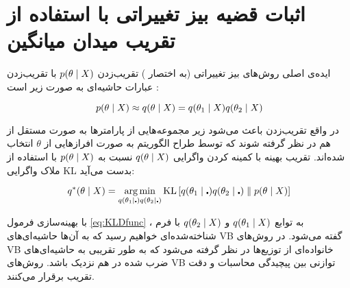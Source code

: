 ﻿%

\section{اثبات قضیه بیز تغییراتی با استفاده از تقریب میدان میانگین}
\label{app:VBProof}

ایده‌ی اصلی روش‌های بیز تغییراتی (به اختصار
)
تقریب‌زدن
$ p ( \theta \mid X ) $
با تقریب‌زدن عبارات حاشیه‌ای به صورت زیر است
\cite{VBMethodsInSignal}:


\begin{equation*}
 p ( \theta \mid X )  \approx
	 q ( \theta \mid X )  =
		 q ( \theta_1 \mid X ) 
		 q ( \theta_2 \mid X ) 
\end{equation*}


در واقع تقریب‌زدن باعث می‌شود زیر مجموعه‌هایی از پارامترها به صورت مستقل
از هم در نظر گرفته شوند که توسط طراح الگوریتم به صورت افرازهایی از
$\theta$
انتخاب شده‌اند. تقریب بهینه با کمینه کردن واگرایی
$ q ( \theta \mid X ) $
نسبت به
$ p ( \theta \mid X ) $
با استفاده از ملاک واگرایی
KL
بدست می‌آید:


\begin{equation}
\label{eq:KLDfunc}
 q^* ( \theta \mid X )  = \underset{
	 q ( \theta_1 \mid \centerdot ) 
	 q ( \theta_2 \mid \centerdot ) 
}{\arg \min}  \operatorname{KL} \left[ 
		 q ( \theta_1 \mid \centerdot ) 
		 q ( \theta_2 \mid \centerdot ) 
	 \parallel 
		 p ( \theta \mid X ) 
	 \right] 
\end{equation}


با بهینه‌سازی فرمول
\eqref{eq:KLDfunc}
، به توابع
$ q ( \theta_1 \mid X ) $
و
$ q ( \theta_2 \mid X ) $
با فرم شناخته‌شده‌ای خواهیم رسید که به آن‌ها حاشیه‌ای‌های
VB
گفته می‌شود. در روش‌های
VB
خانواده‌ای از توزیع‌ها در نظر گرفته می‌شود که به طور تقریبی به حاشیه‌ای‌های
ضرب شده در هم نزدیک باشد. روش‌های
VB
توازنی بین پیچیدگی محاسبات و دقت تقریب برقرار می‌کنند.



